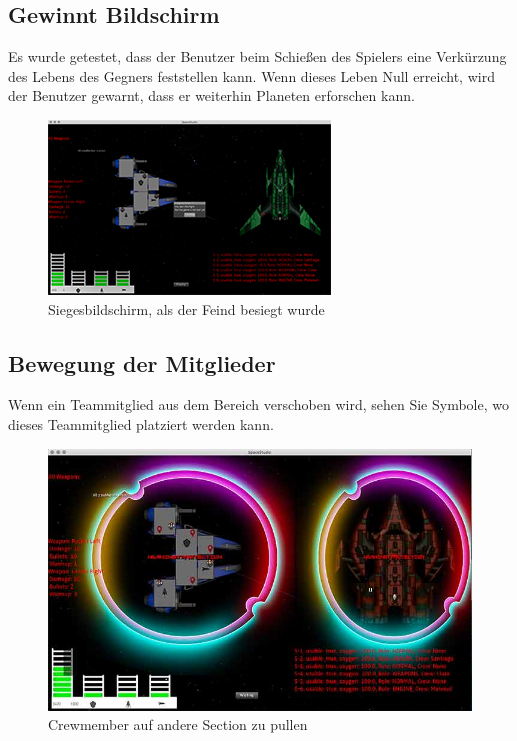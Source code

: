 \documentclass[12pt]{article}
\begin{document}
\newpage
\subsection{Gewinnt Bildschirm}
Es wurde getestet, dass der Benutzer beim Schießen des Spielers eine Verkürzung des Lebens des Gegners feststellen kann. Wenn dieses Leben Null erreicht, wird der Benutzer gewarnt, dass er weiterhin Planeten erforschen kann.
\begin{figure}[htp]
\centering
\includegraphics[scale=1.2]{TestProtocolBilder/wonScreen.jpg}
\caption{Siegesbildschirm, als der Feind besiegt wurde }
\end{figure}
\newpage
\subsection{Bewegung der Mitglieder}
Wenn ein Teammitglied aus dem Bereich verschoben wird, sehen Sie Symbole, wo dieses Teammitglied platziert werden kann.
\begin{figure}[htp]
\centering
\includegraphics[scale=0.6]{TestProtocolBilder/crewmemberpull@0,25x.jpg}
\caption{Crewmember auf andere Section zu pullen}
\end{figure}
\newpage
\end{document}
